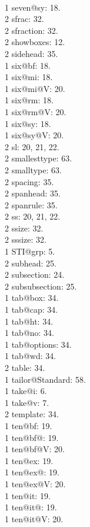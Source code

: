 \\1 seven@sy: 18.
\\2 sfrac: 32.
\\2 sfraction: 32.
\\2 showboxes: 12.
\\2 sidehead: 35.
\\1 six@bf: 18.
\\1 six@mi: 18.
\\1 six@mi@V: 20.
\\1 six@rm: 18.
\\1 six@rm@V: 20.
\\1 six@sy: 18.
\\1 six@sy@V: 20.
\\2 sl: 20, 21, 22.
\\2 smallesttype: 63.
\\2 smalltype: 63.
\\2 spacing: 35.
\\2 spanhead: 35.
\\2 spanrule: 35.
\\2 ss: 20, 21, 22.
\\2 ssize: 32.
\\2 sssize: 32.
\\1 STI@grp: 5.
\\2 subhead: 25.
\\2 subsection: 24.
\\2 subsubsection: 25.
\\1 tab@box: 34.
\\1 tab@cap: 34.
\\1 tab@ht: 34.
\\1 tab@no: 34.
\\1 tab@options: 34.
\\1 tab@wd: 34.
\\2 table: 34.
\\1 tailor@Standard: 58.
\\1 take@i: 6.
\\1 take@v: 7.
\\2 template: 34.
\\1 ten@bf: 19.
\\1 ten@bf@: 19.
\\1 ten@bf@V: 20.
\\1 ten@ex: 19.
\\1 ten@ex@: 19.
\\1 ten@ex@V: 20.
\\1 ten@it: 19.
\\1 ten@it@: 19.
\\1 ten@it@V: 20.
